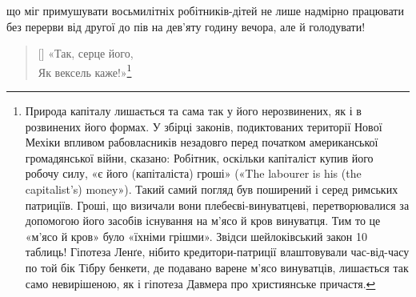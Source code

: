 \parcont{}  %
що міг примушувати восьмилітніх робітників-дітей не лише
надмірно працювати без перерви від другої до пів на дев’яту
годину вечора, але й голодувати!
\vspace{-\bigskipamount}
\settowidth{\versewidth}{Як вексель каже!»}
\begin{verse}[\versewidth]
«Так, серце його, \\
Як вексель каже!»\footnote{
Природа капіталу лишається та сама так у його нерозвинених, як
і в розвинених його формах. У збірці законів, подиктованих території
Нової Мехіки впливом рабовласників незадовго перед початком американської
громадянської війни, сказано: Робітник, оскільки капіталіст
купив його робочу силу, «є його (капіталіста) гроші» («The labourer
is his (the capitalist's) money»). Такий самий погляд був поширений і серед
римських патриціїв. Гроші, що визичали вони плебеєві-винуватцеві,
перетворювалися за допомогою його засобів існування на м'ясо й кров
винуватця. Тим то це «м’ясо й кров» було «їхніми грішми». Звідси шейлоківський
закон 10 таблиць! Гіпотеза Ленґе, нібито кредитори-патриції
влаштовували час-від-часу по той бік Тібру бенкети, де подавано варене
м’ясо винуватців, лишається так само невирішеною, як і гіпотеза
Давмера про християнське причастя.
}
\end{verse}
\vspace{-\bigskipamount}

